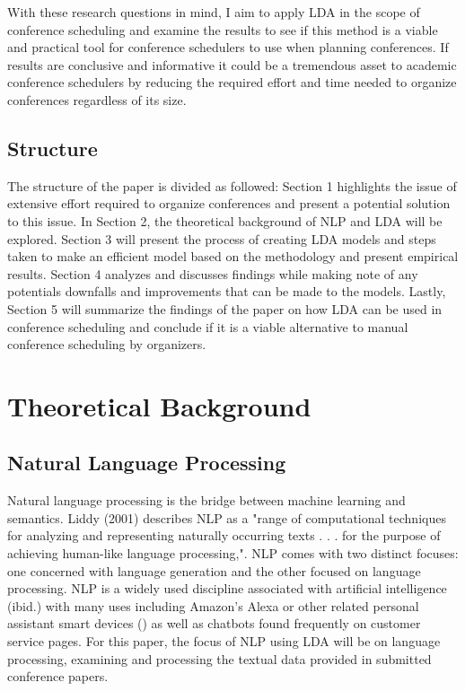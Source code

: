 \documentclass[a4paper, 12pt, twoside]{article}
\numberwithin{equation}{section} %
\begin{document}
With these research questions in mind, I aim to apply LDA in the scope of conference scheduling and examine the results to see if this method is a viable and practical tool for conference schedulers to use when planning conferences. If results are conclusive and informative it could be a tremendous asset to academic conference schedulers by reducing the required effort and time needed to organize conferences regardless of its size. 

\subsection{Structure}

The structure of the paper is divided as followed: Section 1 highlights the issue of extensive effort required to organize conferences and present a potential solution to this issue. In Section 2, the theoretical background of NLP and LDA will be explored. Section 3 will present the process of creating LDA models and steps taken to make an efficient model based on the methodology and present empirical results. Section 4 analyzes and discusses findings while making note of any potentials downfalls and improvements that can be made to the models. Lastly, Section 5 will summarize the findings of the paper on how LDA can be used in conference scheduling and conclude if it is a viable alternative to manual conference scheduling by organizers.

\section{Theoretical Background}

\subsection{Natural Language Processing}

Natural language processing is the bridge between machine learning and semantics. Liddy (2001)\nocite{liddy2001} describes NLP as a "range of computational techniques for analyzing and representing naturally occurring texts . . . for the purpose of achieving human-like language processing,". NLP comes with two distinct focuses: one concerned with language generation and the other focused on language processing. NLP is a widely used discipline associated with artificial intelligence (ibid.) with many uses including Amazon's Alexa or other related personal assistant smart devices (\cite{gonfalonieri2018}) as well as chatbots found frequently on customer service pages. For this paper, the focus of NLP using LDA will be on language processing, examining and processing the textual data provided in submitted conference papers. 
\end{document}
